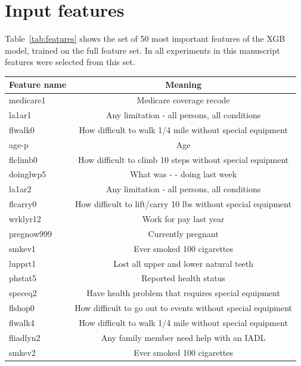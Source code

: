 \documentclass[reqno,11pt]{article}
\begin{document}
\section {Input features}\label{app:feat}
Table~\ref{tab:features} shows the set of 50 most important features of the XGB model, trained on the full feature set. In all experiments in this manuscript features were selected from this set.

\begin{table}[h!]
\tiny
\centering
\begin{tabular}{|| l | c ||} 
 \hline
  Feature name & Meaning \\ [0.5ex] 
 \hline\hline
medicare1   & Medicare coverage recode \\ [0.5ex] 
la1ar1          & Any limitation - all persons, all conditions \\ [0.5ex] 
flwalk0         & How difficult to walk 1/4 mile without special equipment \\ [0.5ex] 
age-p           & Age \\ [0.5ex] 
flclimb0         & How difficult to climb 10 steps without special equipment \\ [0.5ex] 
doinglwp5     & What was - - doing last week \\ [0.5ex] 
la1ar2          & Any limitation - all persons, all conditions \\ [0.5ex] 
flcarry0        & How difficult to lift/carry 10 lbs without special equipment \\ [0.5ex] 
wrklyr12       & Work for pay last year \\ [0.5ex] 
pregnow999 & Currently pregnant \\ [0.5ex] 
smkev1         & Ever smoked 100 cigarettes \\ [0.5ex] 
lupprt1          & Lost all upper and lower natural teeth \\ [0.5ex] 
phstat5         & Reported health status \\ [0.5ex] 
speceq2        & Have health problem that requires special equipment \\ [0.5ex] 
flshop0         & How difficult to go out to events without special equipment \\ [0.5ex] 
flwalk4          & How difficult to walk 1/4 mile without special equipment \\ [0.5ex] 
fliadlyn2        & Any family member need help with an IADL \\ [0.5ex] 
smkev2         & Ever smoked 100 cigarettes \\ [0.5ex] 

\end{tabular}
\end{table}
\end{document}
